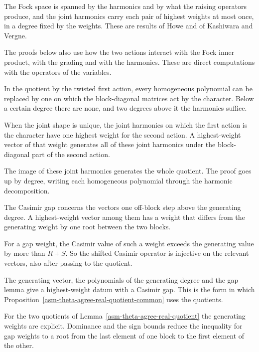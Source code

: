 The Fock space is spanned by the harmonics and by what the raising operators
produce, and the joint harmonics carry each pair of highest weights at most
once, in a degree fixed by the weights. These are results of Howe and of
Kashiwara and Vergne.

The proofs below also use how the two actions interact with the Fock inner
product, with the grading and with the harmonics. These are direct
computations with the operators of the variables.

In the quotient by the twisted first action, every homogeneous polynomial can
be replaced by one on which the block-diagonal matrices act by the character.
Below a certain degree there are none, and two degrees above it the harmonics
suffice.

When the joint shape is unique, the joint harmonics on which the first action
is the character have one highest weight for the second action. A
highest-weight vector of that weight generates all of these joint harmonics
under the block-diagonal part of the second action.

The image of these joint harmonics generates the whole quotient. The proof goes
up by degree, writing each homogeneous polynomial through the harmonic
decomposition.

The Casimir gap concerns the vectors one off-block step above the generating
degree. A highest-weight vector among them has a weight that differs from the
generating weight by one root between the two blocks.

For a gap weight, the Casimir value of such a weight exceeds the generating
value by more than $R+S$. So the shifted Casimir operator is injective on the
relevant vectors, also after passing to the quotient.

The generating vector, the polynomials of the generating degree and the gap
lemma give a highest-weight datum with a Casimir gap. This is the form in which
Proposition~\ref{asm-theta-agree-real-quotient-common} uses the quotients.

For the two quotients of Lemma~\ref{asm-theta-agree-real-quotient} the
generating weights are explicit. Dominance and the sign bounds reduce the
inequality for gap weights to a root from the last element of one block to the
first element of the other.


